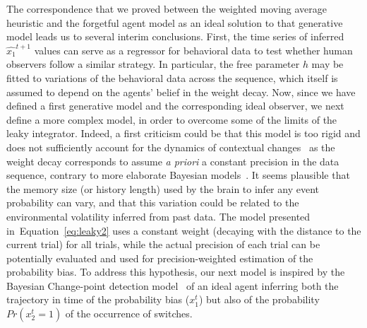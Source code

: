 \documentclass[12pt,english]{article}%
\newcommand{\citep}[1]{\parencite{#1}}
\newcommand{\seeFig}[1]{Figure~\ref{fig:#1}}
\newcommand{\seeEq}[1]{Equation~\ref{eq:#1}}
\begin{document}
The correspondence that we proved between the weighted moving average heuristic
and the forgetful agent model as an ideal solution to that generative model leads
us to several interim conclusions.
First, the time series of inferred $\hat{x_1}^{t+1}$ values 
can serve as a regressor for behavioral data
to test whether human observers follow a similar strategy.
In particular, the free parameter $h$ 
may be fitted to variations of the behavioral data across the sequence, 
which itself is assumed to depend on the agents' belief in the weight decay.
Now, since we have defined a first generative model
and the corresponding ideal observer,
we next define a more complex model,
in order to overcome some of the limits of the leaky integrator.
Indeed, a first criticism could be that
this model is too rigid and does not sufficiently
account for the dynamics of contextual changes~\citep{Behrens07}
as the weight decay corresponds to assume \emph{a priori} a constant precision in the data sequence, contrary to more elaborate Bayesian models~\citep{Vilares2011}.
It seems plausible that the memory size (or history length) used by the brain 
to infer any event probability can vary, and that this variation could be related
to the environmental volatility inferred from past data.
The model presented in~\seeEq{leaky2} uses a constant weight
(decaying with the distance to the current trial)
for all trials, while the actual precision of each trial
can be potentially evaluated and used
for precision-weighted estimation of the probability bias.
To address this hypothesis, our next model is inspired
by the Bayesian Change-point detection model~\citep{AdamsMackay2007}
of an ideal agent inferring
both the trajectory in time of the probability bias ($x_1^t$)
but also of the probability $Pr(x_2^t=1)$ of the occurrence of switches.
\end{document}
